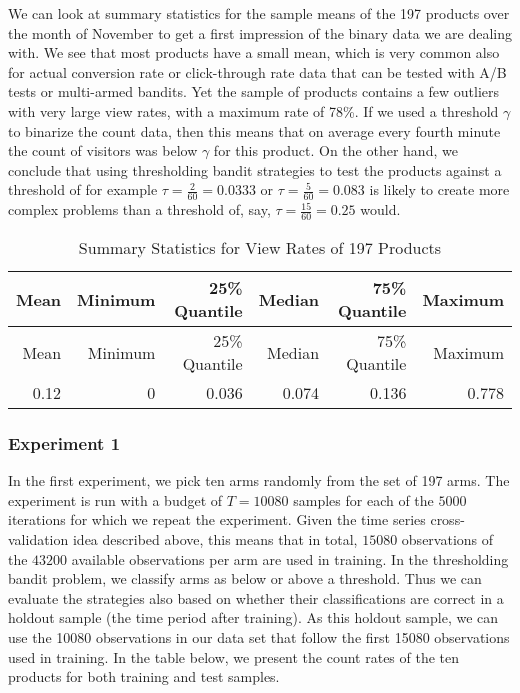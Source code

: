 \documentclass[11pt,]{article}
\begin{document}
We can look at summary statistics for the sample means of the 197
products over the month of November to get a first impression of the
binary data we are dealing with. We see that most products have a small
mean, which is very common also for actual conversion rate or
click-through rate data that can be tested with A/B tests or multi-armed
bandits. Yet the sample of products contains a few outliers with very
large view rates, with a maximum rate of 78\%. If we used a threshold
\(\gamma\) to binarize the count data, then this means that on average
every fourth minute the count of visitors was below \(\gamma\) for this
product. On the other hand, we conclude that using thresholding bandit
strategies to test the products against a threshold of for example
\(\tau = \frac{2}{60} = 0.0333\) or \(\tau = \frac{5}{60} = 0.083\) is
likely to create more complex problems than a threshold of, say,
\(\tau = \frac{15}{60} = 0.25\) would.

\begin{longtable}[]{@{}rrrrrr@{}}
\caption{Summary Statistics for View Rates of 197
Products}\tabularnewline
\toprule
Mean & Minimum & 25\% Quantile & Median & 75\% Quantile &
Maximum\tabularnewline
\midrule
\endfirsthead
\toprule
Mean & Minimum & 25\% Quantile & Median & 75\% Quantile &
Maximum\tabularnewline
\midrule
\endhead
0.12 & 0 & 0.036 & 0.074 & 0.136 & 0.778\tabularnewline
\bottomrule
\end{longtable}

\subsubsection{Experiment 1}\label{experiment-1}

In the first experiment, we pick ten arms randomly from the set of 197
arms. The experiment is run with a budget of \(T=10080\) samples for
each of the \(5000\) iterations for which we repeat the experiment.
Given the time series cross-validation idea described above, this means
that in total, \(15080\) observations of the \(43200\) available
observations per arm are used in training. In the thresholding bandit
problem, we classify arms as below or above a threshold. Thus we can
evaluate the strategies also based on whether their classifications are
correct in a holdout sample (the time period after training). As this
holdout sample, we can use the 10080 observations in our data set that
follow the first 15080 observations used in training. In the table
below, we present the count rates of the ten products for both training
and test samples.
\end{document}
